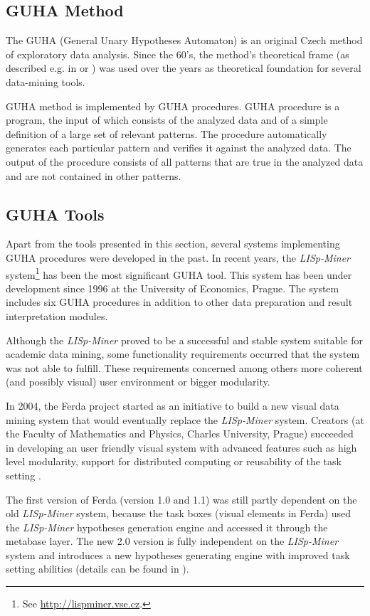 \documentclass{llncs}
\begin{document}
\subsection{GUHA Method}
The GUHA (General Unary Hypotheses Automaton) is an original Czech method
of exploratory data analysis. Since the 60's, the method's theoretical 
frame (as described e.g. in \cite{GUHA1} or \cite{GUHA2}) was used over the
years as theoretical foundation for several data-mining tools. 

GUHA method is implemented by GUHA procedures. GUHA procedure is a program,
the input of which consists of the analyzed data and of a simple
definition of a large set of relevant patterns. The procedure automatically 
generates each particular pattern and verifies it against the analyzed data.
The output of the procedure consists of all patterns that are true in the
analyzed data and are not contained in other patterns.

\subsection{GUHA Tools} %
Apart from the tools presented in this section, several systems implementing
GUHA procedures were developed in the past. In recent years, the
\emph{LISp-Miner} system\footnote{See  \url{http://lispminer.vse.cz}.}
has been the most significant GUHA tool. This system
has been under development since 1996 at the University of Economics, Prague.
The system includes six GUHA procedures in addition to other data 
preparation and result interpretation modules. 

Although the \emph{LISp-Miner} proved to be a successful and stable system 
suitable for academic data mining, some functionality requirements occurred
that the system was not able to fulfill. These requirements concerned among others 
more coherent (and possibly visual) user environment or bigger modularity. 

In 2004, the Ferda project started as an initiative to build a new
visual data mining system that would eventually replace the
\emph{LISp-Miner} system. Creators (at the Faculty of Mathematics and Physics, 
Charles University, Prague) succeeded in developing an user friendly
visual system with advanced features such as high level modularity, support
for distributed computing or reusability of the task setting \cite{Ferda}.

The first version of Ferda (version 1.0 and 1.1) was still partly
dependent on the old \emph{LISp-Miner} system, because the task boxes
(visual elements in Ferda) used the \emph{LISp-Miner} hypotheses generation
engine and accessed it through the metabase layer. The new 2.0 version
is fully independent on the \emph{LISp-Miner} system and introduces a new
hypotheses generating engine with improved task setting abilities (details
can be found in \cite{Kuchar}). 
\end{document}
